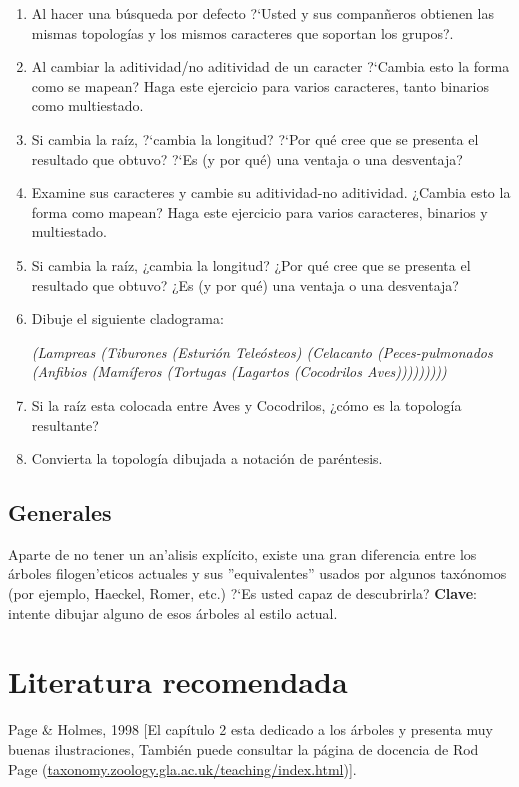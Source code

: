 \begin{enumerate}

	\item Al hacer una b\'usqueda por defecto ?`Usted y sus compan\~neros obtienen las mismas topolog\'ias y los mismos caracteres que soportan los grupos?.

	\item Al cambiar la aditividad/no aditividad de un caracter  ?`Cambia esto la forma como se mapean? Haga este ejercicio para varios caracteres, tanto binarios como multiestado.

	\item Si cambia la ra\'iz, ?`cambia la longitud? ?`Por qu\'e cree que se presenta el resultado que obtuvo? ?`Es (y por qu\'e) una ventaja o una desventaja?

	\item Examine sus caracteres y cambie su aditividad-no aditividad. ¿Cambia esto la forma como mapean? Haga este ejercicio para varios caracteres, binarios y multiestado.

	\item Si cambia la ra\'iz, ¿cambia la longitud? ¿Por qu\'e cree que se presenta el resultado que obtuvo? ¿Es (y por qu\'e) una ventaja o una desventaja?

	\item Dibuje el siguiente cladograma:\\ 
	\begin{small}
	\emph{(Lampreas (Tiburones (Esturi\'on Tele\'osteos) (Celacanto (Peces-pulmonados (Anfibios (Mam\'iferos (Tortugas (Lagartos (Cocodrilos Aves)))))))))}
	\end{small}

	\item Si la ra\'iz esta colocada entre Aves y Cocodrilos, ¿c\'omo es la topolog\'ia resultante?
	
	\item Convierta la topolog\'ia dibujada a notaci\'on de par\'entesis.
\end{enumerate}

\subsection*{Generales}

Aparte de no tener un an'alisis expl\'icito, existe una gran diferencia entre los \'arboles filogen'eticos actuales y sus ''equivalentes'' usados por algunos tax\'onomos (por ejemplo, Haeckel, Romer, etc.) ?`Es usted capaz de descubrirla? \textbf{Clave}: intente dibujar alguno de esos \'arboles al estilo actual.

\section*{Literatura recomendada}

Page \& Holmes, 1998 [El cap\'itulo 2 esta dedicado a los \'arboles y presenta muy buenas ilustraciones, Tambi\'en puede consultar la p\'agina de docencia de Rod Page (\url{taxonomy.zoology.gla.ac.uk/teaching/index.html})].

